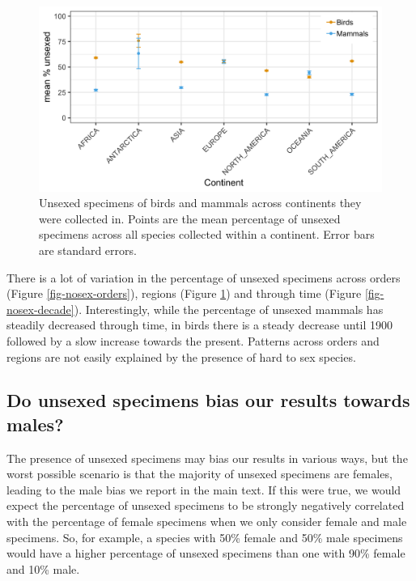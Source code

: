 \documentclass[a4paper, 12pt]{article}
\begin{document}
\begin{figure}[H]
 \centering
  \includegraphics[width = \linewidth]{figures/nosex-regions.png}
  \caption{Unsexed specimens of birds and mammals across continents they were collected in. 
  Points are the mean percentage of unsexed specimens across all species collected within a continent. 
  Error bars are standard errors.}
  \label{fig-nosex-continent}
\end{figure}

There is a lot of variation in the percentage of unsexed specimens across orders (Figure \ref{fig-nosex-orders}), regions (Figure \ref{fig-nosex-continent}) and through time (Figure \ref{fig-nosex-decade}). 
Interestingly, while the percentage of unsexed mammals has steadily decreased through time, in birds there is a steady decrease until 1900 followed by a slow increase towards the present. 
Patterns across orders and regions are not easily explained by the presence of hard to sex species.

\subsection*{Do unsexed specimens bias our results towards males?}

The presence of unsexed specimens may bias our results in various ways, but the worst possible scenario is that the majority of unsexed specimens are females, leading to the male bias we report in the main text. 
If this were true, we would expect the percentage of unsexed specimens to be strongly negatively correlated with the percentage of female specimens when we only consider female and male specimens. 
So, for example, a species with 50\% female and 50\% male specimens would have a higher percentage of unsexed specimens than one with 90\% female and 10\% male. 
\end{document}
